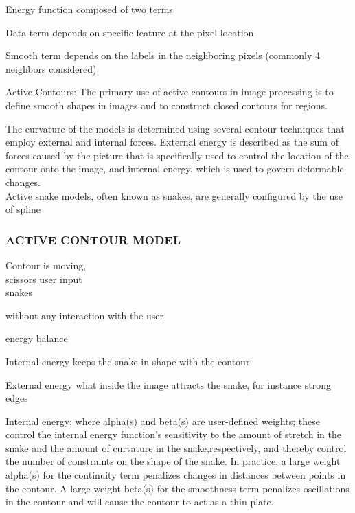 \documentclass[11pt,english]{article}
\begin{document}
Energy function composed of two terms\par
    \makebox[1.5cm]{\textrightarrow} Data term \makebox[0.5cm]{\textrightarrow} depends on specific feature at the pixel location\par
    \makebox[1.5cm]{\textrightarrow} Smooth term \makebox[0.5cm]{\textrightarrow} depends on the labels in the neighboring pixels (commonly 4 neighbors considered)\par
\medskip
Active Contours: The primary use of active contours in image processing is to define smooth shapes in images and to construct closed contours for regions.

\medskip

The curvature of the models is determined using several contour techniques that employ external and internal forces.
External energy is described as the sum of forces caused by the picture that is specifically used to
control the location of the contour onto the image, and internal energy, which is used to govern deformable changes. \\
Active snake models, often known as snakes, are generally configured by the use of spline

\medskip

\subsubsection*{ACTIVE CONTOUR MODEL}
Contour is moving, \\
scissors \makebox[0.5cm]{\textrightarrow} user input \\
snakes \par
    \makebox[1.5cm]{\textrightarrow} without any interaction with the user\par
    \makebox[1.5cm]{\textrightarrow} energy balance \par
    \makebox[2.5cm]{\textrightarrow} Internal energy \makebox[0.5cm]{\textrightarrow} keeps the snake in shape with the contour\par
    \makebox[2.5cm]{\textrightarrow} External energy \makebox[0.5cm]{\textrightarrow} what inside the image attracts the snake, for instance strong edges\par
		
Internal energy: where alpha(s) and beta(s) are user-defined weights; these control the internal energy function's sensitivity to the amount of stretch in the snake and the amount of curvature in the snake,respectively, and thereby control the number of constraints on the shape of the snake.
In practice, a large weight alpha(s) for the continuity term penalizes changes in distances between points in the contour. A large weight beta(s) for the smoothness term penalizes oscillations in the contour and will cause the contour to act as a thin plate.
\end{document}
